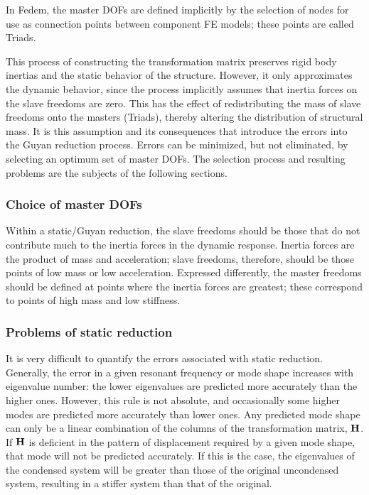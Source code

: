 In Fedem, the master DOFs are defined implicitly by the selection of nodes for use as connection
points between component FE models; these points are called Triads.

This process of constructing the transformation matrix preserves rigid body inertias and the
static behavior of the structure. However, it only approximates the dynamic behavior, since
the process implicitly assumes that inertia forces on the slave freedoms are zero. This has
the effect of redistributing the mass of slave freedoms onto the masters (Triads), thereby
altering the distribution of structural mass. It is this assumption and its consequences that
introduce the errors into the Guyan reduction process. Errors can be minimized, but not eliminated,
by selecting an optimum set of master DOFs. The selection process and resulting problems are
the subjects of the following sections.

\subsubsection{Choice of master DOFs}

Within a static/Guyan reduction, the slave freedoms should be those that do not contribute
much to the inertia forces in the dynamic response. Inertia forces are the product of mass
and acceleration; slave freedoms, therefore, should be those points of low mass or low acceleration.
Expressed differently, the master freedoms should be defined at points where the inertia forces
are greatest; these correspond to points of high mass and low stiffness.

\subsubsection{Problems of static reduction}

It is very difficult to quantify the errors associated with static reduction. Generally, the
error in a given resonant frequency or mode shape increases with eigenvalue number: the lower
eigenvalues are predicted more accurately than the higher ones. However, this rule is not absolute,
and occasionally some higher modes are predicted more accurately than lower ones. Any predicted
mode shape can only be a linear combination of the columns of the transformation matrix, $\bf H$. If $\bf H$ is deficient in the pattern of displacement required by a given mode shape,
that mode will not be predicted accurately. If this is the case, the eigenvalues of the condensed
system will be greater than those of the original uncondensed system, resulting in a stiffer
system than that of the original.


